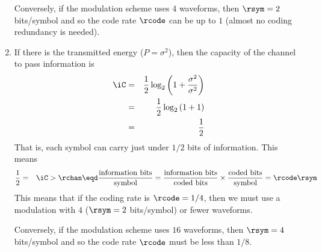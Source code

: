 \begin{example}
\begin{enumerate}
  Conversely, if the modulation scheme uses $4$ waveforms, then
  $\rsym=2$ bits/symbol and so the code rate $\rcode$ can be 
  up to $1$ (almost no coding redundancy is needed).


  \item If there is the transmitted energy ($P=\sigma^2$), 
        then the capacity of the channel to pass information is
    \begin{eqnarray*}
      \iC 
        &=& \frac{1}{2}\log_2\left( 1 + \frac{\sigma^2}{\sigma^2}\right)
      \\&=& \frac{1}{2}\log_2\left( 1 + 1\right)
      \\&=& \frac{1}{2} 
    \end{eqnarray*}
  That is, each symbol can carry just under $1/2$ bits of information.
  This means
  \begin{eqnarray*}
    \frac{1}{2}
      &=& \iC
       >  \rchan
       \eqd \frac{\mbox{information bits}}{\mbox{symbol}}
       = \frac{\mbox{information bits}}{\mbox{coded bits}} \times
         \frac{\mbox{coded bits}}{\mbox{symbol}}
       = \rcode \rsym
  \end{eqnarray*}
  This means that if the coding rate is $\rcode=1/4$,
  then we must use a modulation with $4$ ($\rsym=2$ bits/symbol) 
  or fewer waveforms.

  Conversely, if the modulation scheme uses $16$ waveforms, then
  $\rsym=4$ bits/symbol and so the code rate $\rcode$ must be
  less than $1/8$.
\end{enumerate}
\end{example}
